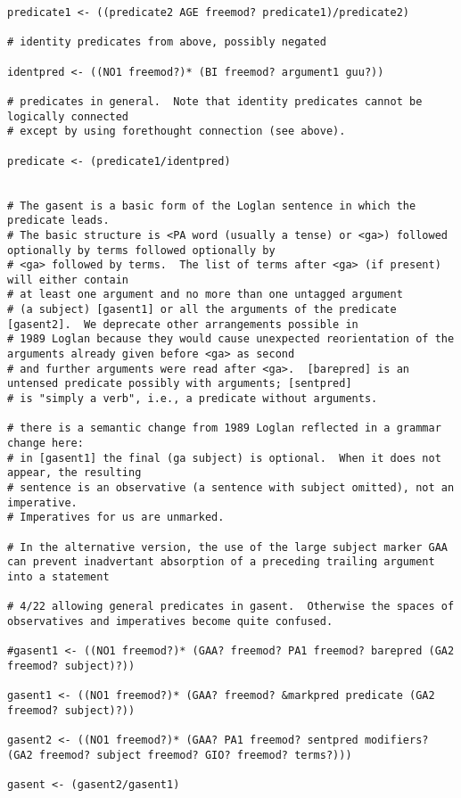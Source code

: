 \documentclass{article}
\begin{document}
\begin{verbatim}
predicate1 <- ((predicate2 AGE freemod? predicate1)/predicate2)

# identity predicates from above, possibly negated

identpred <- ((NO1 freemod?)* (BI freemod? argument1 guu?))

# predicates in general.  Note that identity predicates cannot be logically connected
# except by using forethought connection (see above).

predicate <- (predicate1/identpred)


# The gasent is a basic form of the Loglan sentence in which the predicate leads.
# The basic structure is <PA word (usually a tense) or <ga>) followed optionally by terms followed optionally by
# <ga> followed by terms.  The list of terms after <ga> (if present) will either contain 
# at least one argument and no more than one untagged argument
# (a subject) [gasent1] or all the arguments of the predicate [gasent2].  We deprecate other arrangements possible in
# 1989 Loglan because they would cause unexpected reorientation of the arguments already given before <ga> as second
# and further arguments were read after <ga>.  [barepred] is an untensed predicate possibly with arguments; [sentpred]
# is "simply a verb", i.e., a predicate without arguments.

# there is a semantic change from 1989 Loglan reflected in a grammar change here:
# in [gasent1] the final (ga subject) is optional.  When it does not appear, the resulting
# sentence is an observative (a sentence with subject omitted), not an imperative.
# Imperatives for us are unmarked.

# In the alternative version, the use of the large subject marker GAA can prevent inadvertant absorption of a preceding trailing argument into a statement

# 4/22 allowing general predicates in gasent.  Otherwise the spaces of observatives and imperatives become quite confused.

#gasent1 <- ((NO1 freemod?)* (GAA? freemod? PA1 freemod? barepred (GA2 freemod? subject)?))

gasent1 <- ((NO1 freemod?)* (GAA? freemod? &markpred predicate (GA2 freemod? subject)?))

gasent2 <- ((NO1 freemod?)* (GAA? PA1 freemod? sentpred modifiers? (GA2 freemod? subject freemod? GIO? freemod? terms?)))

gasent <- (gasent2/gasent1)


\end{verbatim}
\end{document}
